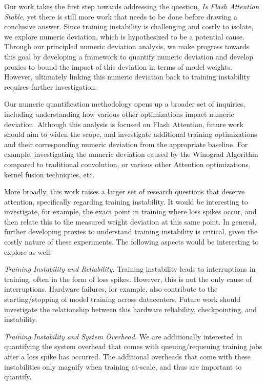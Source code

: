 Our work takes the first step towards addressing the question, \textit{Is Flash Attention Stable}, yet there is still more work that needs to be done before drawing a conclusive answer.  Since training instability is challenging and costly to isolate, we explore numeric deviation, which is hypothesized to be a potential cause. Through our principled numeric deviation analysis, we make progress towards this goal by developing a framework to quantify numeric deviation and develop proxies to bound the impact of this deviation in terms of model weights. However, ultimately linking this numeric deviation back to training instability requires further investigation. 

Our numeric quantification methodology opens up a broader set of inquiries, including understanding how various other optimizations impact numeric deviation. Although this analysis is focused on Flash Attention, future work should aim to widen the scope, and investigate additional training optimizations and their corresponding numeric deviation from the appropriate baseline. For example, investigating the numeric deviation caused by the Winograd Algorithm compared to traditional convolution, or various other Attention optimizations, kernel fusion techniques, etc.

More broadly, this work raises a larger set of research questions that deserve attention, specifically regarding training instability. It would be interesting to investigate, for example, the exact point in training where loss spikes occur, and then relate this to the measured weight deviation at this same point. In general, further developing proxies to understand training instability is critical, given the costly nature of these experiments. The following aspects would be interesting to explore as well:

\textit{Training Instability and Reliability.} Training instability leads to interruptions in training, often in the form of loss spikes. However, this is not the only cause of interruptions. Hardware failures, for example, also contribute to the starting/stopping of model training across datacenters. Future work should investigate the relationship between this hardware reliability, checkpointing, and instability.

\textit{Training Instability and System Overhead.} We are additionally interested in quantifying the system overhead that comes with queuing/requeuing training jobs after a loss spike has occurred. The additional overheads that come with these instabilities only magnify when training at-scale, and thus are important to quantify. 

